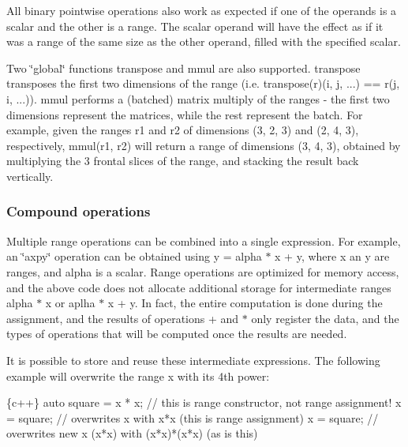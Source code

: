 All binary pointwise operations also work as expected if one of the operands is a scalar and the other is a range. The scalar operand will have the effect as if it was a range of the same size as the other operand, filled with the specified scalar.

Two \char`\"{}global\char`\"{} functions {\ttfamily transpose} and {\ttfamily mmul} are also supported. {\ttfamily transpose} transposes the first two dimensions of the range (i.\+e. {\ttfamily transpose(r)(i, j, ...) == r(j, i, ...)}). {\ttfamily mmul} performs a (batched) matrix multiply of the ranges -\/ the first two dimensions represent the matrices, while the rest represent the batch. For example, given the ranges {\ttfamily r1} and {\ttfamily r2} of dimensions {\ttfamily (3, 2, 3)} and {\ttfamily (2, 4, 3)}, respectively, {\ttfamily mmul(r1, r2)} will return a range of dimensions {\ttfamily (3, 4, 3)}, obtained by multiplying the 3 frontal slices of the range, and stacking the result back vertically.

\subsubsection*{Compound operations }

Multiple range operations can be combined into a single expression. For example, an \char`\"{}axpy\char`\"{} operation can be obtained using {\ttfamily y = alpha $\ast$ x + y}, where {\ttfamily x} an {\ttfamily y} are ranges, and {\ttfamily alpha} is a scalar. Range operations are optimized for memory access, and the above code does not allocate additional storage for intermediate ranges {\ttfamily alpha $\ast$ x} or {\ttfamily aplha $\ast$ x + y}. In fact, the entire computation is done during the assignment, and the results of operations {\ttfamily +} and {\ttfamily $\ast$} only register the data, and the types of operations that will be computed once the results are needed.

It is possible to store and reuse these intermediate expressions. The following example will overwrite the range {\ttfamily x} with it\textquotesingle{}s 4th power\+:


\begin{DoxyCode}
\{c++\}
\textcolor{keyword}{auto} square = x * x;  \textcolor{comment}{// this is range constructor, not range assignment!}
x = square;  \textcolor{comment}{// overwrites x with x*x (this is range assignment)}
x = square;  \textcolor{comment}{// overwrites new x (x*x) with (x*x)*(x*x) (as is this)}
\end{DoxyCode}


